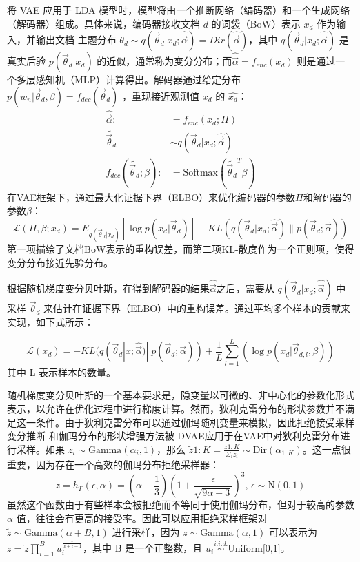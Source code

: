 将 VAE 应用于 LDA 模型时，模型将由一个推断网络（编码器）和一个生成网络（解码器）组成。具体来说，编码器接收文档 $d$ 的词袋（BoW）表示 $x_d$ 作为输入，并输出文档-主题分布 $\theta_d \sim q(\vec\theta_d|x_d;\hat{\vec\alpha})=Dir(\hat{\vec\alpha})$，其中 $q(\vec\theta_d|x_d;\hat{\vec\alpha})$ 是真实后验 $p(\vec\theta_d|x_d)$ 的近似，通常称为变分分布；而$\hat{\vec\alpha} = f_{enc}(x_d)$ 则是通过一个多层感知机（MLP）计算得出。解码器通过给定分布 $p(w_n|\vec\theta_d,\beta)=f_{dec}(\vec\theta_d)$ ，重现接近观测值 $x_d$ 的 $\hat{x_d}$：
\begin{align}
    \hat{\vec\alpha}:&= f_{enc}(x_d;\Pi)\\
    \tilde{\vec\theta_d}&\sim q(\vec\theta_d|x_d;\hat{\vec\alpha})\\
    f_{dec}(\tilde{\vec\theta_d};\beta):&=\mbox{Softmax}(\tilde{\vec\theta_d}^{T}\beta)
\end{align}
在VAE框架下，通过最大化证据下界（ELBO）来优化编码器的参数$\Pi$和解码器的参数$\beta$：
\begin{equation} 
    \mathcal{L}(\Pi,\beta;x_d)=E_{q(\vec\theta_d|x_d)}[\log p(x_d|\vec\theta_d)]-KL(q(\vec\theta_d\vert x_d;\hat{\vec\alpha})\|p(\vec\theta_d;\vec\alpha))
\end{equation}
第一项描绘了文档BoW表示的重构误差，而第二项KL-散度作为一个正则项，使得变分分布接近先验分布。

根据随机梯度变分贝叶斯\cite{}，在得到解码器的结果$\hat{\vec\alpha}$之后，需要从 $q(\vec\theta_d|x_d;\hat{\vec\alpha})$ 中采样 $\vec\theta_d$ 来估计在证据下界（ELBO）中的重构误差。通过平均多个样本的贡献来实现，如下式所示：

\begin{equation}
	\mathcal{L}(x_d)=-KL(q(\vec\theta_d|x;\hat{\vec\alpha})||p(\vec\theta_d;\vec\alpha))+\frac{1}{L}\sum_{l=1}^{L}(\log p(x_d|\vec\theta_{d,l},\beta))
	\label{elbo2}
	\end{equation}
其中 L 表示样本的数量。


随机梯度变分贝叶斯的一个基本要求是，隐变量以可微的、非中心化的参数化形式表示，以允许在优化过程中进行梯度计算。然而，狄利克雷分布的形状参数并不满足这一条件。由于狄利克雷分布可以通过伽玛随机变量来模拟，因此拒绝接受采样变分推断 \cite{RSVI} 和伽玛分布的形状增强方法被 DVAE\cite{DVAE}应用于在VAE中对狄利克雷分布进行采样。如果 $z_i \sim \mbox{Gamma}(\alpha_i, 1)$，那么 $\tilde{z}{1:K} = \frac{z{1:K}}{\Sigma_i z_i} \sim \mbox{Dir}(\alpha_{1:K})$。这一点很重要，因为存在一个高效的伽玛分布拒绝采样器：
\begin{equation}
	z=h_\Gamma(\epsilon,\alpha)=(\alpha-\frac{1}{3})(1+\frac{\epsilon}{\sqrt{9\alpha-3}})^3,\,\epsilon\sim \mbox{N}(0,1)
	\label{rejection}
\end{equation}
虽然这个函数由于有些样本会被拒绝而不等同于使用伽玛分布，但对于较高的参数 $\alpha$ 值，往往会有更高的接受率。因此可以应用拒绝采样框架\cite{RSVI}对 $\tilde{z} \sim \mbox{Gamma}(\alpha+B, 1)$ 进行采样，因为 $z \sim \mbox{Gamma}(\alpha, 1)$ 可以表示为 $z = \tilde{z} \prod_{i=1}^B u_i^{\frac{1}{\alpha+i-1}}$，其中 B 是一个正整数，且 $u_i \overset{i.i.d.}\sim \mbox{Uniform[0,1]}$。